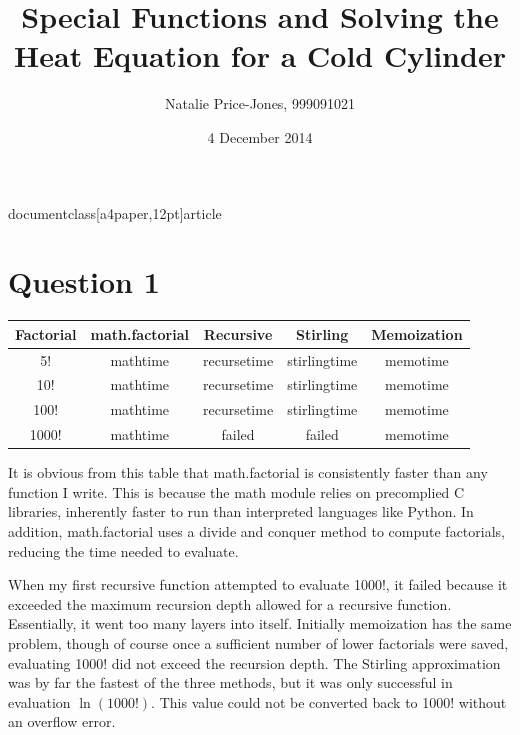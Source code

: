 documentclass[a4paper,12pt]{article}

\usepackage{rotating}
\usepackage[top=1.25in, bottom=1.25in, left=1.25in, right=1.25in]{geometry}
\usepackage{graphicx}
\usepackage[numbers,square,sort&compress]{natbib}
\usepackage{setspace}
\usepackage[cdot,mediumqspace,]{SIunits}
\usepackage{caption}
\usepackage{subcaption}
\usepackage{mathtools}
\usepackage{authblk}
\usepackage{float}
\usepackage{wrapfig}
\renewcommand{\thesubsection}{\thesection.\alph{subsection}}
\providecommand{\e}[1]{\ensuremath{\times 10^{#1}}}
\newcommand*\lap{\mathop{}\!\mathbin\bigtriangleup}


\onehalfspacing
\title{Special Functions and Solving the Heat Equation for a Cold Cylinder}
\author{Natalie Price-Jones, 999091021}
\date{4 December 2014}
\maketitle

\section{Question 1}
\begin{table}[H]
  \centering
  \begin{tabular}{|c||c||c||c||c|}
    \hline
    Factorial & math.factorial & Recursive & Stirling & Memoization\\
    \hline
    \hline
    5! & mathtime & recursetime & stirlingtime & memotime\\
    \hline
    10! & mathtime & recursetime & stirlingtime & memotime\\
    \hline
    100! & mathtime & recursetime & stirlingtime & memotime\\
    \hline
    1000! & mathtime & failed & failed & memotime
  \end{tabular}
\end{table}

It is obvious from this table that math.factorial is consistently faster than any function I write. This is because the math module relies on precomplied C libraries, inherently faster to run than interpreted languages like Python. In addition, math.factorial uses a divide and conquer method to compute factorials, reducing the time needed to evaluate.

When my first recursive function attempted to evaluate 1000!, it failed because it exceeded the maximum recursion depth allowed for a recursive function. Essentially, it went too many layers into itself. Initially memoization has the same problem, though of course once a sufficient number of lower factorials were saved, evaluating 1000! did not exceed the recursion depth. The Stirling approximation was by far the fastest of the three methods, but it was only successful in evaluation $\ln(1000!)$. This value could not be converted back to 1000! without an overflow error.

